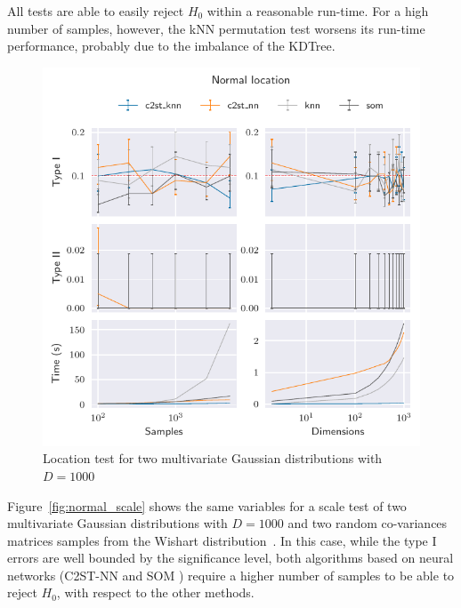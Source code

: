 All tests are able to easily reject $H_0$ within a reasonable run-time. For
a high number of samples, however, the kNN permutation test worsens its run-time performance,
probably due to the imbalance of the KDTree.

\begin{figure}[htpb]
    \centering
    \includegraphics{images/6_som/normal_location}
    \caption{
    Location test for two multivariate Gaussian distributions with $D=1000$
    }
    \label{fig:normal_location}
\end{figure}

Figure~\ref{fig:normal_scale} shows the same variables for a scale test of two multivariate
Gaussian distributions with $D=1000$ and two random co-variances matrices samples from the
Wishart distribution~\cite{smith1972algorithm}. In this case, while the type I errors are
well bounded by the significance level, both algorithms based on neural networks
(C2ST-NN and \gls{SOM} ) require a higher number of samples to be able to reject $H_0$, with respect
to the other methods.


